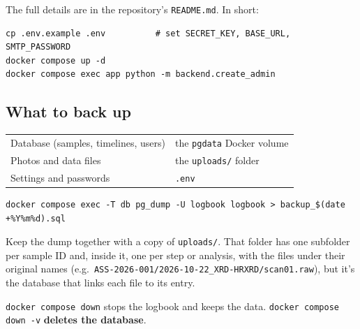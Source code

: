 \documentclass[11pt,a4paper]{article}
\begin{document}
The full details are in the repository's \texttt{README.md}. In short:

\begin{tcolorbox}[colback=gray!5,colframe=gray!40,boxrule=0.4pt,arc=1pt]
\footnotesize
\begin{verbatim}
cp .env.example .env          # set SECRET_KEY, BASE_URL, SMTP_PASSWORD
docker compose up -d
docker compose exec app python -m backend.create_admin
\end{verbatim}
\end{tcolorbox}

\subsection{What to back up}

\begin{center}
\begin{tabular}{@{}ll@{}}
\toprule
Database (samples, timelines, users) & the \texttt{pgdata} Docker volume \\
Photos and data files                & the \texttt{uploads/} folder \\
Settings and passwords               & \texttt{.env} \\
\bottomrule
\end{tabular}
\end{center}

\begin{tcolorbox}[colback=gray!5,colframe=gray!40,boxrule=0.4pt,arc=1pt]
\footnotesize
\begin{verbatim}
docker compose exec -T db pg_dump -U logbook logbook > backup_$(date +%Y%m%d).sql
\end{verbatim}
\end{tcolorbox}

Keep the dump together with a copy of \texttt{uploads/}. That folder
has one subfolder per sample ID and, inside it, one per step or analysis,
with the files under their original names (e.g.\
\nolinkurl{ASS-2026-001/2026-10-22_XRD-HRXRD/scan01.raw}), but it's the
database that links each file to its entry.

\begin{careful}
\texttt{docker compose down} stops the logbook and keeps the data.
\texttt{docker compose down -v} \textbf{deletes the database}.
\end{careful}
\end{document}
